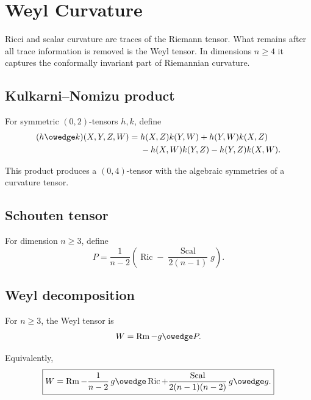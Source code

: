 \chapter{Weyl Curvature}
\label{ch:vii28-weyl}

Ricci and scalar curvature are traces of the Riemann tensor.  What remains after
all trace information is removed is the Weyl tensor.  In dimensions \(n\ge4\) it
captures the conformally invariant part of Riemannian curvature.

\section{Kulkarni--Nomizu product}

\begin{definition}\label{def:vii28-kn}
For symmetric \((0,2)\)-tensors \(h,k\), define
\[
\begin{aligned}
(h\owedge k)(X,Y,Z,W)
={}&
h(X,Z)k(Y,W)+h(Y,W)k(X,Z)\\
&-h(X,W)k(Y,Z)-h(Y,Z)k(X,W).
\end{aligned}
\]
\end{definition}

This product produces a \((0,4)\)-tensor with the algebraic symmetries of a
curvature tensor.

\section{Schouten tensor}

\begin{definition}\label{def:vii28-schouten}
For dimension \(n\ge3\), define
\[
P
=
\frac1{n-2}
\left(
\operatorname{Ric}
-
\frac{\operatorname{Scal}}{2(n-1)}g
\right).
\]
\end{definition}

\section{Weyl decomposition}

\begin{definition}\label{def:vii28-weyl}
For \(n\ge3\), the Weyl tensor is
\[
W
=
\operatorname{Rm}-g\owedge P.
\]
\end{definition}

Equivalently,
\[
\boxed{
W
=
\operatorname{Rm}
-
\frac1{n-2}\,g\owedge\operatorname{Ric}
+
\frac{\operatorname{Scal}}{2(n-1)(n-2)}\,g\owedge g.
}
\]

